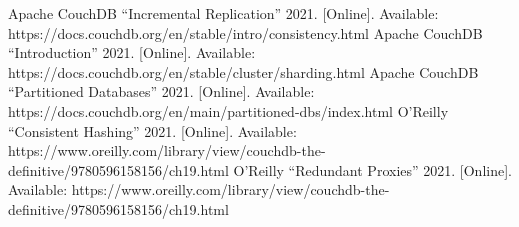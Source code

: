 \documentclass[10pt, conference]{IEEEtran}
\begin{document}
\begin{thebibliography}{00}
 Apache CouchDB “Incremental Replication” 2021. [Online]. Available: https://docs.couchdb.org/en/stable/intro/consistency.html
 Apache CouchDB “Introduction” 2021. [Online]. Available: https://docs.couchdb.org/en/stable/cluster/sharding.html
 Apache CouchDB “Partitioned Databases” 2021. [Online]. Available: https://docs.couchdb.org/en/main/partitioned-dbs/index.html
 O'Reilly “Consistent Hashing” 2021. [Online]. Available: https://www.oreilly.com/library/view/couchdb-the-definitive/9780596158156/ch19.html 
 O'Reilly “Redundant Proxies” 2021. [Online]. Available: https://www.oreilly.com/library/view/couchdb-the-definitive/9780596158156/ch19.html 
\vspace{12pt}
\end{thebibliography}
\end{document}

